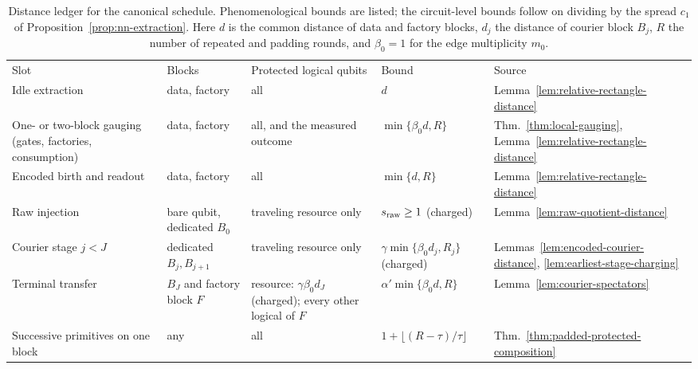 \documentclass[aps,prx,reprint,superscriptaddress,nofootinbib,floatfix,longbibliography]{revtex4-2}
\theoremstyle{definition}
\begin{document}
\begin{table}[t]
\caption{Distance ledger for the canonical schedule.  Phenomenological bounds
are listed; the circuit-level bounds follow on dividing by the spread $c_1$
of Proposition~\ref{prop:nn-extraction}.  Here $d$ is the common distance of
data and factory blocks, $d_j$ the distance of courier block $B_j$, $R$ the
number of repeated and padding rounds, and $\beta_0=1$ for the edge
multiplicity $m_0$.}
\label{tab:distance-ledger}
\begin{ruledtabular}
\begin{tabular}{p{}p{}p{}p{}p{}}
Slot & Blocks & Protected logical qubits & Bound & Source\\
\colrule
Idle extraction & data, factory & all & $d$ & Lemma~\ref{lem:relative-rectangle-distance}\\
One- or two-block gauging (gates, factories, consumption) & data, factory & all, and the measured outcome & $\min\{\beta_0d,R\}$ & Thm.~\ref{thm:local-gauging}, Lemma~\ref{lem:relative-rectangle-distance}\\
Encoded birth and readout & data, factory & all & $\min\{d,R\}$ & Lemma~\ref{lem:relative-rectangle-distance}\\
Raw injection & bare qubit, dedicated $B_0$ & traveling resource only & $s_{\rm raw}\geq1$ (charged) & Lemma~\ref{lem:raw-quotient-distance}\\
Courier stage $j<J$ & dedicated $B_j,B_{j+1}$ & traveling resource only & $\gamma\min\{\beta_0d_j,R_j\}$ (charged) & Lemmas~\ref{lem:encoded-courier-distance}, \ref{lem:earliest-stage-charging}\\
Terminal transfer & $B_J$ and factory block $F$ & resource: $\gamma\beta_0d_J$ (charged); every other logical of $F$ & $\alpha'\min\{\beta_0d,R\}$ & Lemma~\ref{lem:courier-spectators}\\
Successive primitives on one block & any & all & $1+\lfloor(R-\tau)/\tau\rfloor$ & Thm.~\ref{thm:padded-protected-composition}\\
\end{tabular}
\end{ruledtabular}
\end{table}
\end{document}

